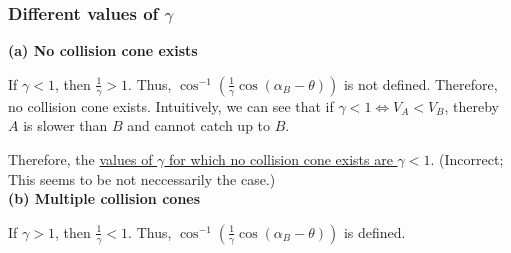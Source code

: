 \subsubsection*{Different values of \( \gamma \)}

\textbf{(a) No collision cone exists}

If \( \gamma < 1 \), then \( \frac{1}{\gamma} > 1 \).
Thus, \( \cos^{-1} \left( \frac{1}{\gamma} \cos (\alpha_B - \theta) \right) \) is not defined.
Therefore, no collision cone exists.
Intuitively, we can see that if \( \gamma < 1 \iff V_A < V_B \), thereby \( A \) is slower than \( B \) and cannot catch up to \( B \).

Therefore, the \underline{values of \( \gamma \) for which no collision cone exists are \( \gamma < 1 \)}.
(Incorrect; This seems to be not neccessarily the case.) \\
\textbf{(b) Multiple collision cones}

If \( \gamma > 1 \), then \( \frac{1}{\gamma} < 1 \).
Thus, \( \cos^{-1} \left( \frac{1}{\gamma} \cos (\alpha_B - \theta) \right) \) is defined.
